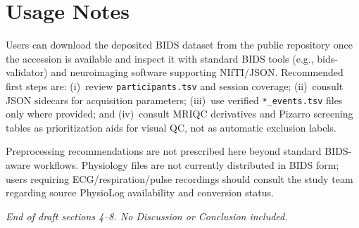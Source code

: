 \documentclass[11pt,letterpaper]{article}
\begin{document}
\section{Usage Notes}

Users can download the deposited BIDS dataset from the public repository once
the accession is available and inspect it with standard BIDS tools
(e.g., bids-validator) and neuroimaging software supporting NIfTI/JSON.
Recommended first steps are: (i)~review \texttt{participants.tsv} and session
coverage; (ii)~consult JSON sidecars for acquisition parameters; (iii)~use
verified \texttt{*\_events.tsv} files only where provided; and
(iv)~consult MRIQC derivatives and Pizarro screening tables as prioritization
aids for visual QC, not as automatic exclusion labels.

Preprocessing recommendations are not prescribed here beyond standard BIDS-aware
workflows.
Physiology files are not currently distributed in BIDS form; users requiring
ECG/respiration/pulse recordings should consult the study team regarding
source PhysioLog availability and conversion status.

\vspace{1.5em}
\noindent\textit{End of draft sections 4--8. No Discussion or Conclusion included.}
\end{document}

